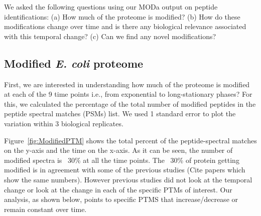 \documentclass[12pt]{article}
\begin{document}
We asked the following questions using our MODa output on peptide identifications:
(a) How much of the proteome is modified? (b) How do these modifications change over time and is there any biological relevance associated with this temporal change? (c) Can we find any novel modifications? 


\subsection{Modified \emph{E. coli} proteome}
First, we are interested in understanding how much of the proteome is modified at each of the 9 time points i.e., from exponential to long-stationary phases? For this, we calculated the percentage of the total number of modified peptides in the peptide spectral matches (PSMs) list. We used 1 standard error to plot the variation within 3 biological replicates.

Figure~\ref{fig:ModifiedPTM} shows the total percent of the peptide-spectral matches on the y-axis and the time on the x-axis. As it can be seen, the number of modified spectra is ~30\% at all the time points. The ~30\% of protein getting modified is in agreement with some of the previous studies (Cite papers which show the same numbers). However previous studies did not look at the temporal change or look at the change in each of the specific PTMs of interest. Our analysis, as shown below, points to specific PTMS that increase/decrease or remain constant over time.

\end{document}
